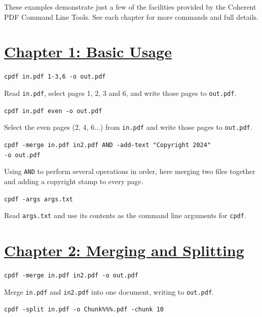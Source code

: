 \documentclass{book}
\begin{document}
These examples demonstrate just a few of the facilities provided by the Coherent PDF Command Line Tools. See each chapter for more commands and full details.

\section*{\hyperref[chap:1]{Chapter 1: Basic Usage}}

\begin{framed}\noindent\texttt{cpdf in.pdf 1-3,6 -o out.pdf}\end{framed}

\noindent Read \texttt{in.pdf}, select pages 1, 2, 3 and 6, and write those pages to \texttt{out.pdf}.


\begin{framed}\noindent\texttt{cpdf in.pdf even -o out.pdf}\end{framed}
                  
\noindent Select the even pages (2, 4, 6...) from \texttt{in.pdf} and write those pages to \texttt{out.pdf}.

\begin{framed}\noindent\texttt{cpdf -merge in.pdf in2.pdf AND -add-text "Copyright 2024"\\\phantom{\ \ \ \ } -o out.pdf}\end{framed}

\noindent Using \texttt{AND} to perform several operations in order, here merging two files together and adding a copyright stamp to every page.

\begin{framed}\noindent\texttt{cpdf -args args.txt}\end{framed}

\noindent Read \texttt{args.txt} and use its contents as the command line arguments for \texttt{cpdf}.

\section*{\hyperref[chap:2]{Chapter 2: Merging and Splitting}}

\begin{framed}\noindent\texttt{cpdf -merge in.pdf in2.pdf -o out.pdf}\end{framed}

\noindent Merge \texttt{in.pdf} and \texttt{in2.pdf} into one document, writing to \texttt{out.pdf}.

\begin{framed}\noindent\texttt{cpdf -split in.pdf -o Chunk\%\%\%.pdf -chunk 10}\end{framed}
\end{document}

